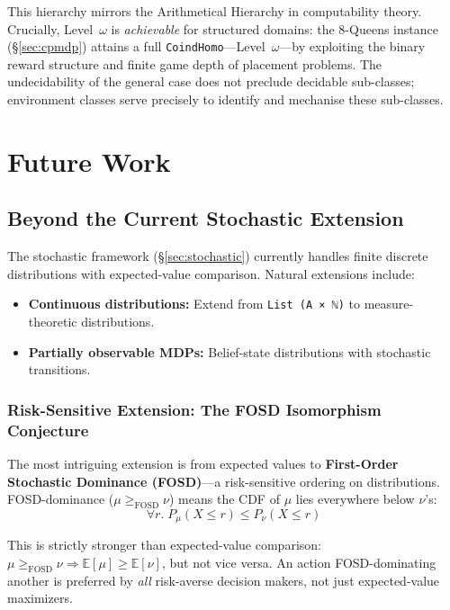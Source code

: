 \documentclass[9pt,a4paper]{article}
\theoremstyle{plain}
\theoremstyle{definition}
\theoremstyle{remark}
\begin{document}
This hierarchy mirrors the Arithmetical Hierarchy \cite{Rogers1987} in computability theory.  Crucially, Level~$\omega$ is \emph{achievable} for structured domains: the 8-Queens instance (\S\ref{sec:cpmdp}) attains a full \texttt{CoindHomo}---Level~$\omega$---by exploiting the binary reward structure and finite game depth of placement problems.  The undecidability of the general case does not preclude decidable sub-classes; environment classes serve precisely to identify and mechanise these sub-classes.

\section{Future Work}

\subsection{Beyond the Current Stochastic Extension}

The stochastic framework (\S\ref{sec:stochastic}) currently handles finite discrete distributions with expected-value comparison. Natural extensions include:
\begin{itemize}
\item \textbf{Continuous distributions:} Extend from \texttt{List (A × ℕ)} to measure-theoretic distributions.
\item \textbf{Partially observable MDPs:} Belief-state distributions with stochastic transitions.
\end{itemize}

\subsubsection{Risk-Sensitive Extension: The FOSD Isomorphism Conjecture}

The most intriguing extension is from expected values to \textbf{First-Order Stochastic Dominance (FOSD)}---a risk-sensitive ordering on distributions. FOSD-dominance ($\mu \ge_{\text{FOSD}} \nu$) means the CDF of $\mu$ lies everywhere below $\nu$'s:
\[
\forall r.\; P_\mu(X \le r) \le P_\nu(X \le r)
\]

This is strictly stronger than expected-value comparison: $\mu \ge_{\text{FOSD}} \nu \Rightarrow \mathbb{E}[\mu] \ge \mathbb{E}[\nu]$, but not vice versa. An action FOSD-dominating another is preferred by \emph{all} risk-averse decision makers, not just expected-value maximizers.
\end{document}
